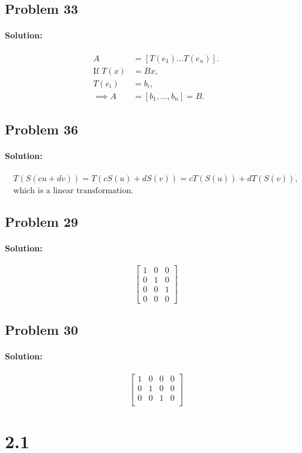 \documentclass[11pt, notitlepage]{article}
\newenvironment{solution}{\paragraph{Solution:}}{\hfill}
\begin{document}
\subsection{Problem 33}
\begin{solution}
\begin{align*}
	A &= [T(e_1) ... T(e_n)]. \\
	\text{If }T(x)&=Bx,\\
	T(e_i)&=b_i, \\
	\implies A&=[b_1,...,b_n]=B.
\end{align*}
\end{solution}
\subsection{Problem 36}
\begin{solution}
	\begin{align*}
		T(S(cu+dv))=T(cS(u)+dS(v))=cT(S(u))+dT(S(v)), \\
		\text{which is a linear transformation.}
	\end{align*}
\end{solution}
\subsection{Problem 29}
\begin{solution}
\[\begin{bmatrix}{}
  1&0 &0 \\
  0&1 &0 \\
  0&0 &1 \\
  0&0 &0
\end{bmatrix}\]
\end{solution}
\subsection{Problem 30}
\begin{solution}
\[\begin{bmatrix}{}
  1&0 &0&0 \\
  0&1 &0&0 \\
  0&0 &1&0 \\
\end{bmatrix}\]
\end{solution}

\newpage
\section{2.1} 
\end{document}

